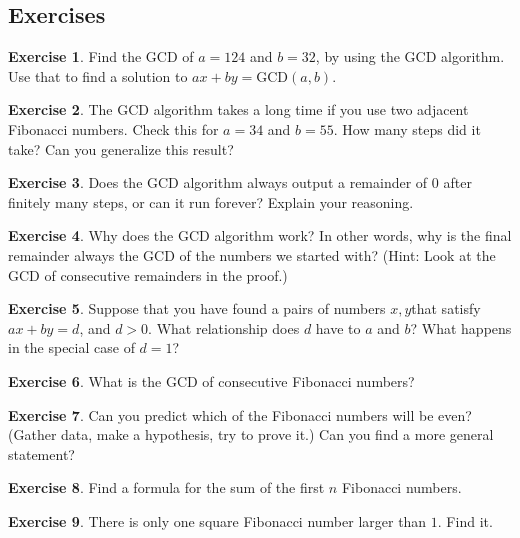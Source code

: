 \documentclass[11pt]{article}
\theoremstyle{definition}
\newtheorem{exercise}{Exercise}
\numberwithin{thm}{section}
\begin{document}
\subsection{Exercises}

\begin{exercise} Find the GCD of $a = 124$ and $b = 32$, by using the GCD algorithm. Use that to find a solution to $ax + by = \text{GCD}(a,b)$.
\end{exercise}

\begin{exercise} The GCD algorithm takes a long time if you use two adjacent Fibonacci numbers. Check this for $a = 34$ and $b = 55$. How many steps did it take? Can you generalize this result?
\end{exercise}

\begin{exercise} Does the GCD algorithm always output a remainder of $0$ after finitely many steps, or can it run forever? Explain your reasoning.
\end{exercise}

\begin{exercise} Why does the GCD algorithm work? In other words, why is the final remainder always the GCD of the numbers we started with? (Hint: Look at the GCD of consecutive remainders in the proof.)
\end{exercise}

\begin{exercise} Suppose that you have found a pairs of numbers $x,y$that satisfy $ax + by = d$, and $d >0$. What relationship does $d$ have to $a$ and $b$? What happens in the special case of $d = 1$?
\end{exercise}

\begin{exercise} What is the GCD of consecutive Fibonacci numbers?
\end{exercise}

\begin{exercise} Can you predict which of the Fibonacci numbers will be even? (Gather data, make a hypothesis, try to prove it.) Can you find a more general statement?
\end{exercise}

\begin{exercise} Find a formula for the sum of the first $n$ Fibonacci numbers. 
\end{exercise}

\begin{exercise} There is only one square Fibonacci number larger than $1$. Find it.
\end{exercise}
\end{document}
